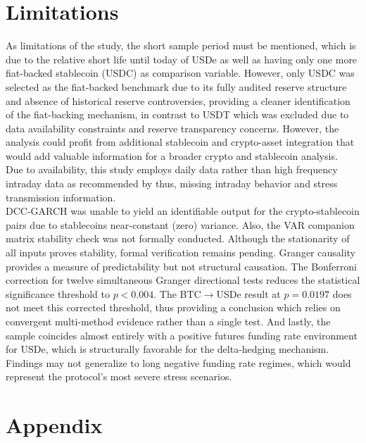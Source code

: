\documentclass[12pt,a4paper,titlepage,oneside,english]{article}
\begin{document}
\section{Limitations}
As limitations of the study, the short sample period must be mentioned, which is due to the relative short life until today of USDe as well as having only one more fiat-backed stablecoin (USDC) as comparison variable.
However, only USDC was selected as the fiat-backed benchmark due to its fully audited reserve structure and absence of historical reserve controversies, providing a cleaner identification of the fiat-backing mechanism, in contrast to USDT which was excluded due to data availability constraints and reserve transparency concerns. However, the analysis could profit from additional stablecoin and crypto-asset integration that would add valuable information for a broader crypto and stablecoin analysis.\\
Due to availability, this study employs daily data rather than high frequency intraday data as recommended by \parencite{Chen03032026} thus, missing intraday behavior and stress transmission information.\\
DCC-GARCH was unable to yield an identifiable output for the crypto-stablecoin pairs due to stablecoins near-constant (zero) variance. Also, the VAR companion matrix stability check was not formally conducted. Although the stationarity of all inputs proves stability, formal verification remains pending. 
Granger causality provides a measure of predictability but not structural causation. The Bonferroni correction for twelve simultaneous Granger directional tests reduces the statistical significance threshold to $p<0.004$. The BTC$\rightarrow$USDe result at $p=0.0197$ does not meet this corrected threshold, thus providing a conclusion which relies on convergent multi-method evidence rather than a single test. And lastly, the sample coincides almost entirely with a positive futures funding rate environment for USDe, which is structurally favorable for the delta-hedging mechanism. Findings may not generalize to long negative funding rate regimes, which would represent the protocol's most severe stress scenarios. 


\section{Appendix}
\end{document}
